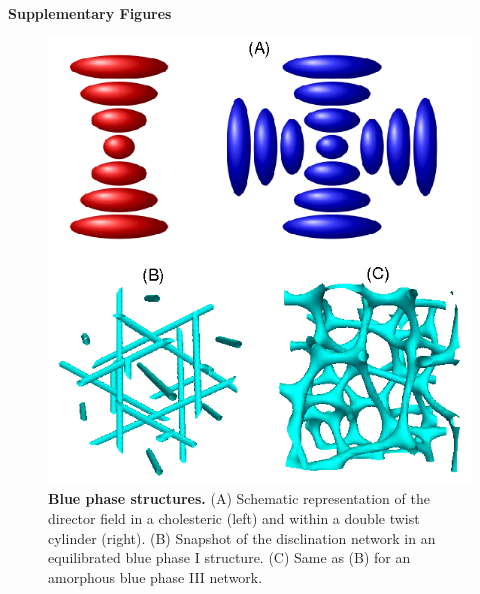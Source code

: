 \documentclass[12pt,twoside]{article}
\begin{document}
{\bf Supplementary Figures}

\begin{figure}[!h]
\begin{center}
\includegraphics[scale=0.8]{support-fig1.png}
\end{center}
\caption{\textbf{Blue phase structures.}
(A) Schematic representation of the director field
in a cholesteric (left) and within a double twist cylinder (right).
(B) Snapshot of the disclination network in an equilibrated 
blue phase I structure. (C) Same as (B) for an amorphous blue phase III
network.}
\end{figure}

\newpage
\end{document}
